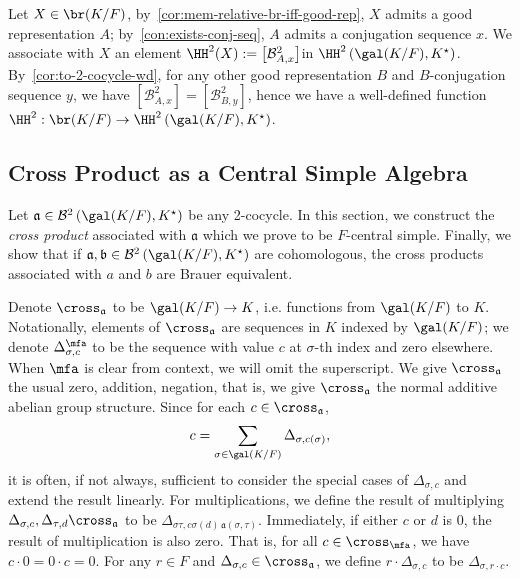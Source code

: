 \begin{construction}\label{con:br-to-snd-coh}
  Let $X \in \br(K/F)$, by~\cref{cor:mem-relative-br-iff-good-rep}, $X$ admits a good representation $A$; by~\cref{con:exists-conj-seq}, $A$ admits a conjugation sequence $x$. We associate with $X$ an element $\HH^{2}(X) := \left[\mathcal{B}^{2}_{A,x}\right]$in $\HH^{2}\left(\gal(K/F),K^{\star}\right)$. By~\cref{cor:to-2-cocycle-wd}, for any other good representation $B$ and $B$-conjugation sequence $y$, we have $\left[\mathcal{B}^{2}_{A,x}\right]=\left[\mathcal{B}^{2}_{B,y}\right]$, hence we have a well-defined function $\HH^{2} : \br(K/F) \to \HH^{2}\left(\gal(K/F),K^{\star}\right)$.
  \leanok
\end{construction}

\subsection{Cross Product as a Central Simple Algebra}

Let $\mathfrak{a} \in \mathcal{B}^{2}\left(\gal(K/F), K^{\star}\right)$ be any 2-cocycle. In this section, we construct the {\em cross product\/} associated with $\mathfrak{a}$ which we prove to be $F$-central simple. Finally, we show that if $\mathfrak{a}, \mathfrak{b}\in\mathcal{B}^{2}\left(\gal(K/F), K^{\star}\right)$ are cohomologous, the cross products associated with $a$ and $b$ are Brauer equivalent.

\begin{construction}\label{con:cross-product}
  Denote $\cross_{\mathfrak{a}}$ to be $\gal(K/F) \to K$, i.e. functions from $\gal(K/F)$ to $K$. Notationally, elements of $\cross_{\mathfrak{a}}$ are sequences in $K$ indexed by $\gal(K/F)$; we denote $\Delta^{\mfa}_{\sigma, c}$ to be the sequence with value $c$ at $\sigma$-th index and zero elsewhere. When $\mfa$ is clear from context, we will omit the superscript. We give $\cross_{\mathfrak{a}}$ the usual zero, addition, negation, that is, we give $\cross_{\mathfrak{a}}$ the normal additive abelian group structure. Since for each $c \in \cross_{\mathfrak{a}}$,
  \[
    c = \sum_{\sigma\in\gal(K/F)}\Delta_{\sigma, c(\sigma)},
    \]
    it is often, if not always, sufficient to consider the special cases of $\Delta_{\sigma, c}$ and extend the result linearly.
  For multiplications, we define the result of multiplying $\Delta_{\sigma, c},\Delta_{\tau, d} \cross_{\mathfrak{a}}$ to be $\Delta_{\sigma\tau, c\sigma(d)\, \mathfrak{a}(\sigma,\tau)}$. Immediately, if either $c$ or $d$ is $0$, the result of multiplication is also zero. That is, for all $c \in \cross_{\mfa}$, we have $c\cdot 0=0\cdot c =0$. For any $r \in F$ and $\Delta_{\sigma, c} \in \cross_{\mathfrak{a}}$, we define $r \cdot \Delta_{\sigma, c}$ to be $\Delta_{\sigma, r\cdot c}$.
  \leanok
\end{construction}


